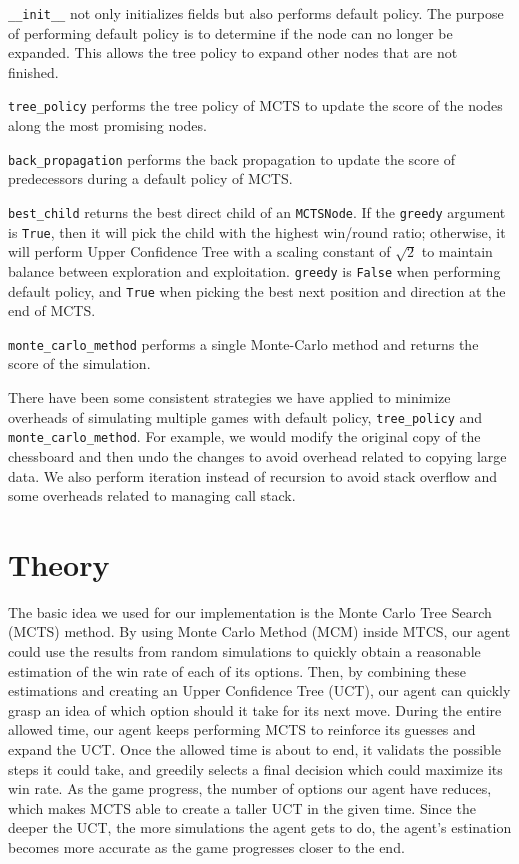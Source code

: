 \documentclass[twoside,11pt]{article}
\begin{document}
\texttt{\_\_init\_\_} not only initializes fields but also performs default policy.
The purpose of performing default policy is to determine if the node can no longer be expanded.
This allows the tree policy to expand other nodes that are not finished.

\texttt{tree\_policy} performs the tree policy of MCTS to update the score of the nodes along the most promising nodes.

\texttt{back\_propagation} performs the back propagation to update the score of predecessors during a default policy of MCTS.

\texttt{best\_child} returns the best direct child of an \texttt{MCTSNode}.
If the \texttt{greedy} argument is \texttt{True}, then it will pick the child with the highest win/round ratio;
otherwise, it will perform Upper Confidence Tree with a scaling constant of \(\sqrt{2}\) to maintain balance between exploration and exploitation.
\texttt{greedy} is \texttt{False} when performing default policy, and \texttt{True} when picking the best next position and direction at the end of MCTS.

\texttt{monte\_carlo\_method} performs a single Monte-Carlo method and returns the score of the simulation.

There have been some consistent strategies we have applied to minimize overheads of simulating multiple games with default policy, \texttt{tree\_policy} and \texttt{monte\_carlo\_method}.
For example, we would modify the original copy of the chessboard and then undo the changes to avoid overhead related to copying large data.
We also perform iteration instead of recursion to avoid stack overflow and some overheads related to managing call stack.

\section{Theory}
The basic idea we used for our implementation is the Monte Carlo Tree Search (MCTS) method.
By using Monte Carlo Method (MCM) inside MTCS, our agent could use the results from random simulations to quickly obtain a reasonable estimation of the win rate of each of its options.
Then, by combining these estimations and creating an Upper Confidence Tree (UCT), our agent can quickly grasp an idea of which option should it take for its next move.
During the entire allowed time, our agent keeps performing MCTS to reinforce its guesses and expand the UCT.
Once the allowed time is about to end, it validats the possible steps it could take, and greedily selects a final decision which could maximize its win rate.
As the game progress, the number of options our agent have reduces, which makes MCTS able to create a taller UCT in the given time. 
Since the deeper the UCT, the more simulations the agent gets to do, the agent's estination becomes more accurate as the game progresses closer to the end.
\end{document}

